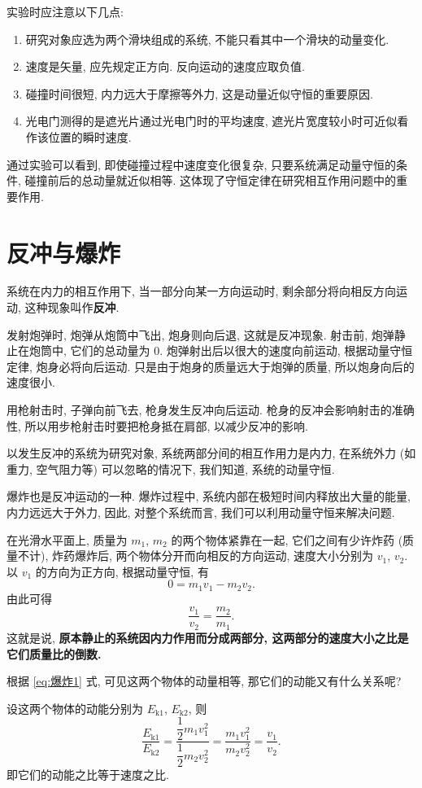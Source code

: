 \documentclass[UTF8,openany,fontset=fandol]{ctexbook}
\theoremstyle{chinesetextbook}
\begin{document}
实验时应注意以下几点:
\begin{enumerate}
\item 研究对象应选为两个滑块组成的系统, 不能只看其中一个滑块的动量变化.
\item 速度是矢量, 应先规定正方向. 反向运动的速度应取负值.
\item 碰撞时间很短, 内力远大于摩擦等外力, 这是动量近似守恒的重要原因.
\item 光电门测得的是遮光片通过光电门时的平均速度, 遮光片宽度较小时可近似看作该位置的瞬时速度.
\end{enumerate}

通过实验可以看到, 即使碰撞过程中速度变化很复杂, 只要系统满足动量守恒的条件, 碰撞前后的总动量就近似相等. 这体现了守恒定律在研究相互作用问题中的重要作用.
\section{反冲与爆炸}
系统在内力的相互作用下, 当一部分向某一方向运动时, 剩余部分将向相反方向运动, 这种现象叫作\textbf{反冲}.

发射炮弹时, 炮弹从炮筒中飞出, 炮身则向后退, 这就是反冲现象. 射击前, 炮弹静止在炮筒中, 它们的总动量为 0. 炮弹射出后以很大的速度向前运动, 根据动量守恒定律, 炮身必将向后运动. 只是由于炮身的质量远大于炮弹的质量, 所以炮身向后的速度很小.

用枪射击时, 子弹向前飞去, 枪身发生反冲向后运动. 枪身的反冲会影响射击的准确性, 所以用步枪射击时要把枪身抵在肩部, 以减少反冲的影响.

以发生反冲的系统为研究对象, 系统两部分间的相互作用力是内力, 在系统外力 (如重力, 空气阻力等) 可以忽略的情况下, 我们知道, 系统的动量守恒.

爆炸也是反冲运动的一种. 爆炸过程中, 系统内部在极短时间内释放出大量的能量, 内力远远大于外力, 因此, 对整个系统而言, 我们可以利用动量守恒来解决问题.

在光滑水平面上, 质量为 $m_1$, $m_2$ 的两个物体紧靠在一起, 它们之间有少许炸药 (质量不计), 炸药爆炸后, 两个物体分开而向相反的方向运动, 速度大小分别为 $v_1$, $v_2$. 以 $v_1$ 的方向为正方向, 根据动量守恒, 有
\begin{equation}\label{eq:爆炸1}
0=m_1v_1-m_2v_2.
\end{equation}
由此可得
\[
\frac{v_1}{v_2}=\frac{m_2}{m_1}.
\]
这就是说, \textbf{原本静止的系统因内力作用而分成两部分, 这两部分的速度大小之比是它们质量比的倒数.}

{\kaishu 根据 \eqref{eq:爆炸1} 式, 可见这两个物体的动量相等, 那它们的动能又有什么关系呢?}

设这两个物体的动能分别为 $E_\mathrm{k1}$, $E_\mathrm{k2}$, 则
\[
\frac{E_\mathrm{k1}}{E_\mathrm{k2}}=\frac{\dfrac12 m_1v_1^2}{\dfrac12m_2v_2^2}=\frac{m_1v_1^2}{m_2v_2^2}=\frac{v_1}{v_2}.
\]
即它们的动能之比等于速度之比.
\end{document}
